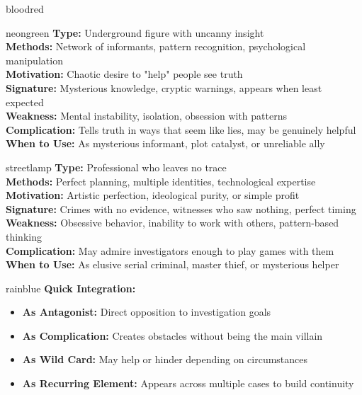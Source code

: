 \documentclass[11pt]{article}
\begin{document}
\begin{noirsection}{bloodred}
\begin{suspectbox}{neongreen}
\textbf{Type:} Underground figure with uncanny insight\\
\textbf{Methods:} Network of informants, pattern recognition, psychological manipulation\\
\textbf{Motivation:} Chaotic desire to "help" people see truth\\
\textbf{Signature:} Mysterious knowledge, cryptic warnings, appears when least expected\\
\textbf{Weakness:} Mental instability, isolation, obsession with patterns\\
\textbf{Complication:} Tells truth in ways that seem like lies, may be genuinely helpful\\
\textbf{When to Use:} As mysterious informant, plot catalyst, or unreliable ally
\end{suspectbox}

\begin{suspectbox}{streetlamp}
\textbf{Type:} Professional who leaves no trace\\
\textbf{Methods:} Perfect planning, multiple identities, technological expertise\\
\textbf{Motivation:} Artistic perfection, ideological purity, or simple profit\\
\textbf{Signature:} Crimes with no evidence, witnesses who saw nothing, perfect timing\\
\textbf{Weakness:} Obsessive behavior, inability to work with others, pattern-based thinking\\
\textbf{Complication:} May admire investigators enough to play games with them\\
\textbf{When to Use:} As elusive serial criminal, master thief, or mysterious helper
\end{suspectbox}

\begin{mechanicbox}{rainblue}
\textbf{Quick Integration:}
\begin{itemize}
    \item \textbf{As Antagonist:} Direct opposition to investigation goals
    \item \textbf{As Complication:} Creates obstacles without being the main villain
    \item \textbf{As Wild Card:} May help or hinder depending on circumstances
    \item \textbf{As Recurring Element:} Appears across multiple cases to build continuity
\end{itemize}


\end{mechanicbox}
\end{noirsection}
\end{document}
